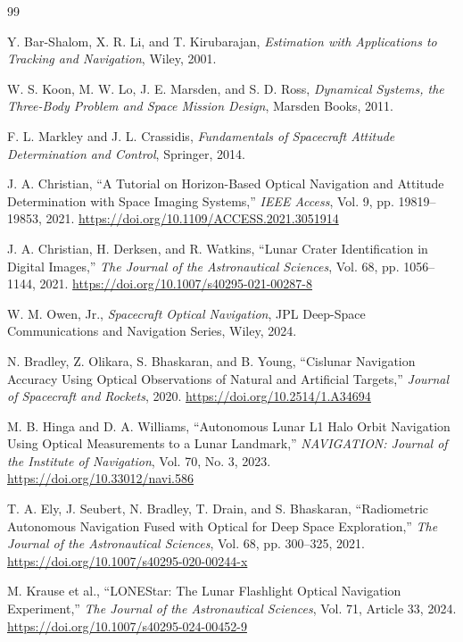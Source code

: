\documentclass[10pt,twocolumn]{article}
\begin{document}
\begin{thebibliography}{99}

Y. Bar-Shalom, X. R. Li, and T. Kirubarajan, \textit{Estimation with Applications to Tracking and Navigation}, Wiley, 2001.

W. S. Koon, M. W. Lo, J. E. Marsden, and S. D. Ross, \textit{Dynamical Systems, the Three-Body Problem and Space Mission Design}, Marsden Books, 2011.

F. L. Markley and J. L. Crassidis, \textit{Fundamentals of Spacecraft Attitude Determination and Control}, Springer, 2014.

J. A. Christian, ``A Tutorial on Horizon-Based Optical Navigation and Attitude Determination with Space Imaging Systems,'' \textit{IEEE Access}, Vol. 9, pp. 19819--19853, 2021. \url{https://doi.org/10.1109/ACCESS.2021.3051914}

J. A. Christian, H. Derksen, and R. Watkins, ``Lunar Crater Identification in Digital Images,'' \textit{The Journal of the Astronautical Sciences}, Vol. 68, pp. 1056--1144, 2021. \url{https://doi.org/10.1007/s40295-021-00287-8}

W. M. Owen, Jr., \textit{Spacecraft Optical Navigation}, JPL Deep-Space Communications and Navigation Series, Wiley, 2024.

N. Bradley, Z. Olikara, S. Bhaskaran, and B. Young, ``Cislunar Navigation Accuracy Using Optical Observations of Natural and Artificial Targets,'' \textit{Journal of Spacecraft and Rockets}, 2020. \url{https://doi.org/10.2514/1.A34694}

M. B. Hinga and D. A. Williams, ``Autonomous Lunar L1 Halo Orbit Navigation Using Optical Measurements to a Lunar Landmark,'' \textit{NAVIGATION: Journal of the Institute of Navigation}, Vol. 70, No. 3, 2023. \url{https://doi.org/10.33012/navi.586}

T. A. Ely, J. Seubert, N. Bradley, T. Drain, and S. Bhaskaran, ``Radiometric Autonomous Navigation Fused with Optical for Deep Space Exploration,'' \textit{The Journal of the Astronautical Sciences}, Vol. 68, pp. 300--325, 2021. \url{https://doi.org/10.1007/s40295-020-00244-x}

M. Krause et al., ``LONEStar: The Lunar Flashlight Optical Navigation Experiment,'' \textit{The Journal of the Astronautical Sciences}, Vol. 71, Article 33, 2024. \url{https://doi.org/10.1007/s40295-024-00452-9}


\end{thebibliography}
\end{document}
